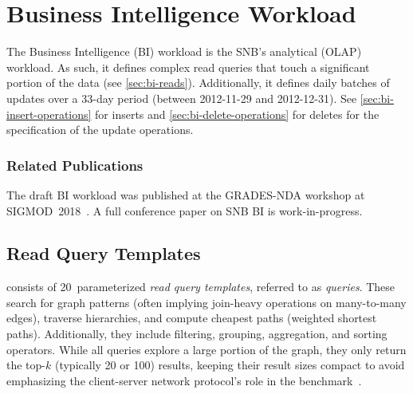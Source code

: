 \chapter{Business Intelligence Workload}
\label{sec:bi}

The Business Intelligence (BI) workload is the SNB's analytical (OLAP) workload.
As such, it defines complex read queries that touch a significant portion of the data (see \autoref{sec:bi-reads}).
Additionally, it defines daily batches of updates over a 33-day period (between 2012-11-29 and 2012-12-31).
See
\autoref{sec:bi-insert-operations} for inserts and
\autoref{sec:bi-delete-operations} for deletes for the specification of the update operations.



\subsection*{Related Publications}

The draft BI workload was published at the \mbox{GRADES-NDA} workshop at \mbox{SIGMOD 2018}~\cite{DBLP:conf/grades/SzarnyasPAMPKEB18}.
A full conference paper on SNB BI is work-in-progress.


\section{Read Query Templates}
\label{sec:queries}


\snbbi consists of 20~parameterized \emph{read query templates}, referred to as \emph{queries}. These search for graph patterns (often implying join-heavy operations on many-to-many edges), traverse hierarchies, and compute cheapest paths (\aka weighted shortest paths).
Additionally, they include filtering, grouping, aggregation, and sorting operators.
While all queries explore a large portion of the graph, they only return the top-$k$ (typically 20 or 100) results,
keeping their result sizes compact to avoid emphasizing the client-server network protocol's role in the benchmark~\cite{DBLP:journals/pvldb/RaasveldtM17}.

